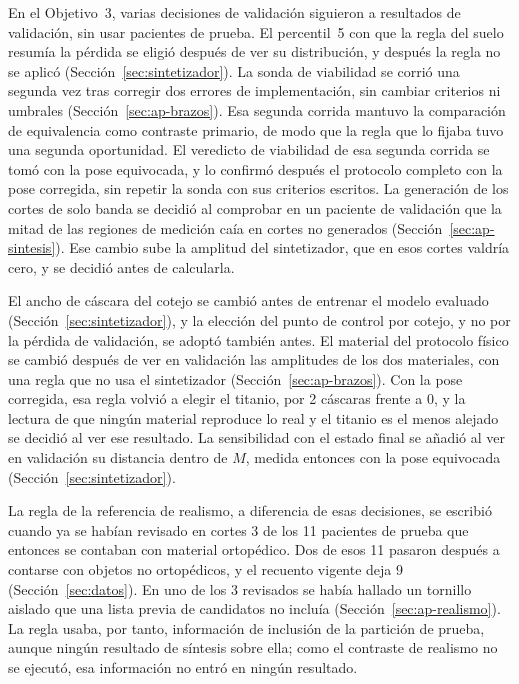En el Objetivo~3, varias decisiones de validación siguieron a resultados de validación, sin usar pacientes de prueba. El percentil~5 con que la regla del suelo resumía la pérdida se eligió después de ver su distribución, y después la regla no se aplicó (Sección~\ref{sec:sintetizador}). La sonda de viabilidad se corrió una segunda vez tras corregir dos errores de implementación, sin cambiar criterios ni umbrales (Sección~\ref{sec:ap-brazos}). Esa segunda corrida mantuvo la comparación de equivalencia como contraste primario, de modo que la regla que lo fijaba tuvo una segunda oportunidad. El veredicto de viabilidad de esa segunda corrida se tomó con la pose equivocada, y lo confirmó después el protocolo completo con la pose corregida, sin repetir la sonda con sus criterios escritos. La generación de los cortes de solo banda se decidió al comprobar en un paciente de validación que la mitad de las regiones de medición caía en cortes no generados (Sección~\ref{sec:ap-sintesis}). Ese cambio sube la amplitud del sintetizador, que en esos cortes valdría cero, y se decidió antes de calcularla.

El ancho de cáscara del cotejo se cambió antes de entrenar el modelo evaluado (Sección~\ref{sec:sintetizador}), y la elección del punto de control por cotejo, y no por la pérdida de validación, se adoptó también antes. El material del protocolo físico se cambió después de ver en validación las amplitudes de los dos materiales, con una regla que no usa el sintetizador (Sección~\ref{sec:ap-brazos}). Con la pose corregida, esa regla volvió a elegir el titanio, por 2 cáscaras frente a 0, y la lectura de que ningún material reproduce lo real y el titanio es el menos alejado se decidió al ver ese resultado. La sensibilidad con el estado final se añadió al ver en validación su distancia dentro de $M$, medida entonces con la pose equivocada (Sección~\ref{sec:sintetizador}).

La regla de la referencia de realismo, a diferencia de esas decisiones, se escribió cuando ya se habían revisado en cortes 3 de los 11 pacientes de prueba que entonces se contaban con material ortopédico. Dos de esos 11 pasaron después a contarse con objetos no ortopédicos, y el recuento vigente deja 9 (Sección~\ref{sec:datos}). En uno de los 3 revisados se había hallado un tornillo aislado que una lista previa de candidatos no incluía (Sección~\ref{sec:ap-realismo}). La regla usaba, por tanto, información de inclusión de la partición de prueba, aunque ningún resultado de síntesis sobre ella; como el contraste de realismo no se ejecutó, esa información no entró en ningún resultado.

